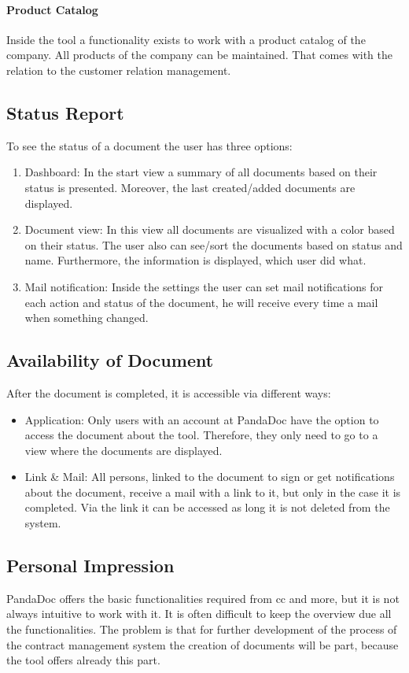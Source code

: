 \paragraph{Product Catalog}
Inside the tool a functionality exists to work with a product catalog of the company. All products of the company can be maintained. That comes with the relation to the customer relation management.

\subsection{Status Report}
To see the status of a document the user has three options:
\begin{enumerate}
	\item Dashboard: In the start view a summary of all documents based on their status is presented. Moreover, the last created/added documents are displayed.
	\item Document view: In this view all documents are visualized with a color based on their status. The user also can see/sort the documents based on status and name. Furthermore, the information is displayed, which user did what.
	\item Mail notification: Inside the settings the user can set mail notifications for each action and status of the document, he will receive every time a mail when something changed.
\end{enumerate}

\subsection{Availability of Document}
After the document is completed, it is accessible via different ways:
\begin{itemize}
	\item Application: Only users with an account at PandaDoc have the option to access the document about the tool. Therefore, they only need to go to a view where the documents are displayed. 
	\item Link \& Mail: All persons, linked to the document to sign or get notifications about the document, receive a mail with a link to it, but only in the case it is completed. Via the link it can be accessed as long it is not deleted from the system.
\end{itemize} 

\subsection{Personal Impression}
PandaDoc offers the basic functionalities required from \gls{cc} and more, but it is not always intuitive to work with it. It is often difficult to keep the overview due all the functionalities. The problem is that for further development of the process of the contract management system the creation of documents  will be part, because the tool offers already this part.